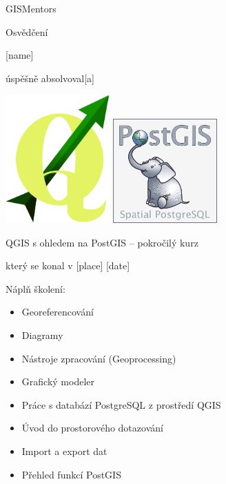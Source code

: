 \documentclass[12pt, a4paper]{letter}
\begin{document}
\pagestyle{empty}
\begin{center}

{\Large GISMentors}

{\Huge Osvědčení}

{\Large [name]}

úspěšně absolvoval[a]

\includegraphics[width=0.30\textwidth]{../images/qgislogo_vector.eps}
\includegraphics[width=0.30\textwidth]{../images/postgis.png}

{\Large QGIS s ohledem na PostGIS -- pokročilý kurz}

který se konal v [place] [date]
\end{center}

Náplň školení:

\begin{itemize}
        \item Georeferencování
        \item Diagramy
        \item Nástroje zpracování (Geoprocessing)
        \item Grafický modeler
        \item Práce s databází PostgreSQL z prostředí QGIS
        \item Úvod do prostorového dotazování
        \item Import a export dat
        \item Přehled funkcí PostGIS
\end{itemize}
\end{document}
